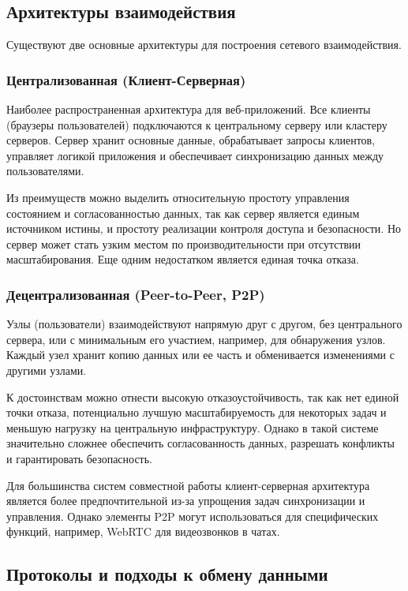 \subsection{Архитектуры взаимодействия}

Существуют две основные архитектуры для построения сетевого взаимодействия.

\subsubsection{Централизованная (Клиент-Серверная)} 

Наиболее распространенная архитектура для веб-приложений. 
Все клиенты (браузеры пользователей) подключаются к центральному серверу или кластеру серверов. 
Сервер хранит основные данные, обрабатывает запросы клиентов, управляет логикой приложения и обеспечивает синхронизацию данных между пользователями.

Из преимуществ можно выделить относительную простоту управления состоянием и согласованностью данных, так как сервер является единым источником истины, и простоту реализации контроля доступа и безопасности.
Но сервер может стать узким местом по производительности при отсутствии масштабирования. 
Еще одним недостатком является единая точка отказа.

\subsubsection{Децентрализованная (Peer-to-Peer, P2P)} 
Узлы (пользователи) взаимодействуют напрямую друг с другом, без центрального сервера, или с минимальным его участием, например, для обнаружения узлов. 
Каждый узел хранит копию данных или ее часть и обменивается изменениями с другими узлами.

К достоинствам можно отнести высокую отказоустойчивость, так как нет единой точки отказа, потенциально лучшую масштабируемость для некоторых задач и меньшую нагрузку на центральную инфраструктуру.
Однако в такой системе значительно сложнее обеспечить согласованность данных, разрешать конфликты и гарантировать безопасность. 

Для большинства систем совместной работы клиент-серверная архитектура является более предпочтительной из-за упрощения задач синхронизации и управления. 
Однако элементы P2P могут использоваться для специфических функций, например, WebRTC для видеозвонков в чатах.

\subsection{Протоколы и подходы к обмену данными}

